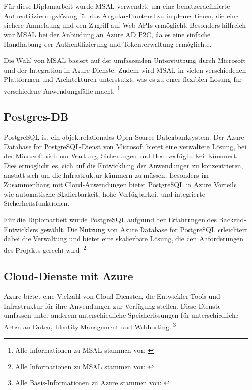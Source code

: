 Für diese Diplomarbeit wurde MSAL verwendet, um eine benutzerdefinierte Authentifizierungslösung 
für das Angular-Frontend zu implementieren, die eine sichere Anmeldung und den Zugriff auf 
Web-APIs ermöglicht. Besonders hilfreich war MSAL bei der Anbindung an Azure AD B2C, da es 
eine einfache Handhabung der Authentifizierung und Tokenverwaltung ermöglichte.

Die Wahl von MSAL basiert auf der umfassenden Unterstützung durch Microsoft und der 
Integration in Azure-Dienste. Zudem wird MSAL in vielen verschiedenen Plattformen und 
Architekturen unterstützt, was es zu einer flexiblen Lösung für verschiedene Anwendungsfälle 
macht.
\footnote{Alle Informationen zu MSAL stammen von: \cite{MicrosoftCorporationr}}

\subsection{Postgres-DB}
\label{subsection:postgres_db}

PostgreSQL ist ein objektrelationales Open-Source-Datenbanksystem. Der Azure Database for 
PostgreSQL-Dienst von Microsoft bietet eine verwaltete Lösung, bei der Microsoft sich 
um Wartung, Sicherungen und Hochverfügbarkeit kümmert. Dies ermöglicht es, 
sich auf die Entwicklung der Anwendungen zu konzentrieren, anstatt sich um die 
Infrastruktur kümmern zu müssen. Besonders im Zusammenhang mit Cloud-Anwendungen 
bietet PostgreSQL in Azure Vorteile wie automatische Skalierbarkeit, hohe Verfügbarkeit 
und integrierte Sicherheitsfunktionen.

Für die Diplomarbeit wurde PostgreSQL aufgrund der Erfahrungen des Backend-Entwicklers gewählt. 
Die Nutzung von Azure Database for PostgreSQL erleichtert dabei die Verwaltung und 
bietet eine skalierbare Lösung, die den Anforderungen des Projekts gerecht wird.
\footnote{Alle Informationen zu MSAL stammen von: \cite{MicrosoftCorporations}}

\subsection{Cloud-Dienste mit Azure}

Azure bietet eine Vielzahl von Cloud-Diensten, die Entwickler-Tools und Infrastruktur 
für ihre Anwendungen zur Verfügung stellen. Diese Dienste umfassen 
unter anderem unterschiedliche Speicherlösungen für unterschiedliche Arten an Daten, 
Identity-Management und Webhosting.
\footnote{Alle Basis-Informationen zu Azure stammen von: \cite{MicrosoftCorporationt}}

